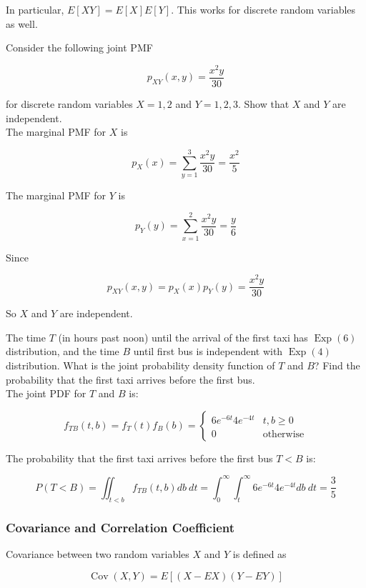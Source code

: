 \documentclass[12pt, a4paper]{article}
\newcounter{exa}
\newcommand{\Cov}{\operatorname{Cov}}
\newcommand{\Exp}{\operatorname{Exp}}
\begin{document}
In particular, $E[XY]=E[X]E[Y]$. This works for discrete random variables as well.

\begin{texample}
Consider the following joint PMF

\[ p_{XY}(x,y)=\frac{x^2y}{30} \]

for discrete random variables $X=1,2$ and $Y=1,2,3$. Show that $X$ and $Y$ are independent. \\

The marginal PMF for $X$ is

\[p_X(x)=\sum_{y=1}^3 \frac{x^2y}{30} = \frac{x^2}{5}\]

The marginal PMF for $Y$ is

\[p_Y(y)=\sum_{x=1}^2 \frac{x^2y}{30} = \frac{y}{6}\]

Since

\[p_{XY}(x,y)=p_X(x)p_Y(y)=\frac{x^2y}{30}\]

So $X$ and $Y$ are independent.
\end{texample}

\begin{texample}
The time $T$ (in hours past noon) until the arrival of the first taxi has $\Exp(6)$ distribution, and the time $B$ until first bus is independent with $\Exp(4)$ distribution. What is the joint probability density function of $T$ and $B$? Find the probability that the first taxi arrives before the first bus. \\

The joint PDF for $T$ and $B$ is:

\[ f_{TB}(t,b)=f_T(t)f_B(b)=\begin{cases} 6e^{-6t}4e^{-4t} & t,b \ge 0 \\ 0 & \text{otherwise} \end{cases} \]

The probability that the first taxi arrives before the first bus $T<B$ is:

\[P(T<B)=\iint_{t<b} f_{TB}(t,b)db\:dt=\int_0^\infty \int_t^\infty 6e^{-6t}4e^{-4t} db\:dt=\frac35\]
\end{texample}

\subsubsection{Covariance and Correlation Coefficient}

Covariance between two random variables $X$ and $Y$ is defined as

\[ \Cov(X,Y)=E[(X-EX)(Y-EY)] \]
\end{document}
